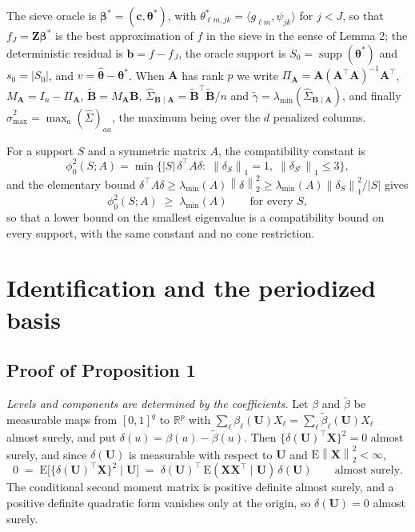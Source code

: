 \documentclass[10pt]{book}
\theoremstyle{definition}
\newcommand{\R}{\mathbb{R}}
\newcommand{\E}{\mathrm{E}}
\newcommand{\T}{^{\top}}
\newcommand{\norm}[1]{\left\lVert #1 \right\rVert}
\newcommand{\inner}[2]{\langle #1, #2 \rangle}
\newcommand{\cv}{\ell}
\newcommand{\md}{m}
\newcommand{\lev}{j}
\newcommand{\tsl}{k}
\newcommand{\bX}{\mathbf{X}}
\newcommand{\bU}{\mathbf{U}}
\newcommand{\bZ}{\mathbf{Z}}
\newcommand{\fcoef}[1]{\beta_{#1}}
\newcommand{\gcomp}[2]{g_{#1#2}}
\newcommand{\wav}[2]{\psi_{#1#2}}
\newcommand{\coefs}[4]{\theta^{*}_{#1#2,#3#4}}
\newcommand{\btheta}{\boldsymbol{\theta}}
\newcommand{\thetastar}{\btheta^{*}}
\newcommand{\thetahat}{\widehat{\btheta}}
\newcommand{\bbeta}{\boldsymbol{\beta}}
\newcommand{\betastar}{\bbeta^{*}}
\newcommand{\bc}{\mathbf{c}}
\newcommand{\Gramhat}{\widehat{\Sigma}}
\newcommand{\Szero}{S_{0}}
\newcommand{\Amat}{\mathbf{A}}
\newcommand{\Bmat}{\mathbf{B}}
\newcommand{\Btil}{\widetilde{\Bmat}}
\newcommand{\PA}{\Pi_{\Amat}}
\newcommand{\MA}{M_{\Amat}}
\newcommand{\bb}{\mathbf{b}}
\newcommand{\smax}{\widehat{\sigma}_{\max}}
\newcommand{\gtil}{\widetilde{\gamma}}
\newcommand{\lmin}{\lambda_{\min}}
\newcommand{\compat}{\phi_{0}}
\newcommand{\GBA}{\Gramhat_{\Bmat\mid\Amat}}
\DeclareMathOperator{\supp}{supp}
\begin{document}
The sieve oracle is $\betastar = (\bc,\thetastar)$, with
$\coefs{\cv}{\md}{\lev}{\tsl} = \inner{\gcomp{\cv}{\md}}{\wav{\lev}{\tsl}}$
for $\lev < J$, so that $f_J = \bZ\betastar$ is the best approximation of $f$
in the sieve in the sense of Lemma 2; the deterministic residual is
$\bb = f - f_J$, the oracle support is $\Szero = \supp(\thetastar)$ and
$s_0 = |\Szero|$, and $v = \thetahat - \thetastar$. When $\Amat$ has rank $p$
we write $\PA = \Amat(\Amat\T\Amat)^{-1}\Amat\T$, $\MA = I_n - \PA$,
$\Btil = \MA\Bmat$, $\GBA = \Btil\T\Btil/n$ and $\gtil = \lmin(\GBA)$, and
finally $\smax^2 = \max_a(\Gramhat)_{aa}$, the maximum being over the $d$
penalized columns.

For a support $S$ and a symmetric matrix $A$, the compatibility constant is
\[
  \compat^2(S;A) = \min\bigl\{|S|\,\delta\T A \delta :\;
  \norm{\delta_S}_1 = 1,\; \norm{\delta_{S^c}}_1 \le 3 \bigr\},
\]
and the elementary bound
$\delta\T A\delta \ge \lmin(A)\norm{\delta}_2^2 \ge
\lmin(A)\norm{\delta_S}_1^2/|S|$ gives
\begin{equation}
  \label{eq:compat-lmin}
  \compat^2(S;A) \;\ge\; \lmin(A) \qquad \text{for every } S,
\end{equation}
so that a lower bound on the smallest eigenvalue is a compatibility bound on
every support, with the same constant and no cone restriction.

\section{Identification and the periodized basis}
\setcounter{equation}{0}

\subsection*{Proof of Proposition 1}

\emph{Levels and components are determined by the coefficients.} Let $\beta$
and $\tilde\beta$ be measurable maps from $[0,1]^q$ to $\R^p$ with
$\sum_{\cv}\fcoef{\cv}(\bU)X_{\cv} = \sum_{\cv}\tilde\beta_{\cv}(\bU)X_{\cv}$
almost surely, and put $\delta(u) = \beta(u)-\tilde\beta(u)$. Then
$\{\delta(\bU)\T\bX\}^2 = 0$ almost surely, and since $\delta(\bU)$ is
measurable with respect to $\bU$ and $\E\norm{\bX}_2^2 < \infty$,
\[
  0 \;=\; \E\bigl[\{\delta(\bU)\T\bX\}^2 \mid \bU\bigr]
  \;=\; \delta(\bU)\T\,\E(\bX\bX\T\mid\bU)\,\delta(\bU)
  \qquad \text{almost surely.}
\]
The conditional second moment matrix is positive definite almost surely, and a
positive definite quadratic form vanishes only at the origin, so
$\delta(\bU) = 0$ almost surely.
\end{document}

